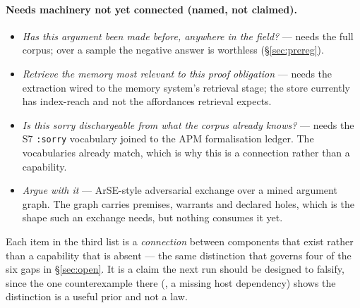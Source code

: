 \paragraph{Needs machinery not yet connected (named, not claimed).}
\begin{itemize}
\item \emph{Has this argument been made before, anywhere in the field?} ---
needs the full corpus; over a sample the negative answer is worthless
(\S\ref{sec:prereg}).
\item \emph{Retrieve the memory most relevant to this proof obligation} ---
needs the extraction wired to the memory system's retrieval stage; the
store currently has index-reach and not the affordances retrieval expects.
\item \emph{Is this sorry dischargeable from what the corpus already knows?}
--- needs the S7 \texttt{:sorry} vocabulary joined to the APM formalisation
ledger. The vocabularies already match, which is why this is a connection
rather than a capability.
\item \emph{Argue with it} --- ArSE-style adversarial exchange over a mined
argument graph. The graph carries premises, warrants and declared holes, which
is the shape such an exchange needs, but nothing consumes it yet.
\end{itemize}

Each item in the third list is a \emph{connection} between components that
exist rather than a capability that is absent --- the same distinction that
governs four of the six gaps in \S\ref{sec:open}. It is a claim the next run
should be designed to falsify, since the one counterexample there
(, a missing host dependency) shows the distinction is a useful prior
and not a law.
